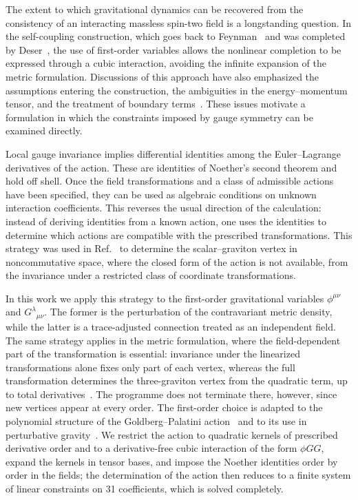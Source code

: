 \documentclass[prd,aps,preprint,superscriptaddress,nofootinbib,amsmath,amssymb,eqsecnum]{revtex4-2}
\begin{document}
The extent to which gravitational dynamics can be recovered from the consistency of an
interacting massless spin-two field is a longstanding question. In the self-coupling
construction, which goes back to Feynman~\cite{Feynman1995} and was completed by
Deser~\cite{Deser1970}, the use of first-order variables allows the nonlinear completion to
be expressed through a cubic interaction, avoiding the infinite expansion of the metric
formulation. Discussions of this approach have also emphasized the
assumptions entering the construction, the ambiguities in the energy--momentum tensor, and the
treatment of boundary terms~\cite{Padmanabhan2008,Deser2010}. These issues motivate a
formulation in which the constraints imposed by gauge symmetry can be examined directly.

Local gauge invariance implies differential identities among the Euler--Lagrange derivatives
of the action. These are identities of Noether's second theorem and hold off shell. Once the
field transformations and a class of admissible actions have been specified, they can be used
as algebraic conditions on unknown interaction coefficients. This reverses the usual direction
of the calculation: instead of deriving identities from a known action, one uses the
identities to determine which actions are compatible with the prescribed transformations.
This strategy was used in Ref.~\cite{BrandtElias2006} to determine the scalar--graviton
vertex in noncommutative space, where the closed form of the action is not available, from
the invariance under a restricted class of coordinate transformations.

In this work we apply this strategy to the first-order gravitational variables $\phi^{\mu\nu}$
and $G^{\lambda}{}_{\mu\nu}$. The former is the perturbation of the contravariant metric
density, while the latter is a trace-adjusted connection treated as an independent field. The
same strategy applies in the metric formulation, where the field-dependent part of the
transformation is essential: invariance under the linearized transformations alone fixes
only part of each vertex, whereas the full transformation determines the three-graviton
vertex from the quadratic term, up to total derivatives~\cite{BrandtFrenkel1996}. The
programme does not terminate there, however, since new vertices appear at every order. The first-order choice is adapted to the polynomial
structure of the Goldberg--Palatini action~\cite{Goldberg1958,Palatini1919,Ferraris1982} and
to its use in perturbative gravity~\cite{BrandtMcKeon2016}. We restrict the action to quadratic kernels of
prescribed derivative order and to a derivative-free cubic interaction of the form $\phi GG$,
expand the kernels in tensor bases, and impose the Noether identities order by order in the
fields; the determination of the action then reduces to a finite system of linear constraints on 31
coefficients, which is solved completely.
\end{document}
